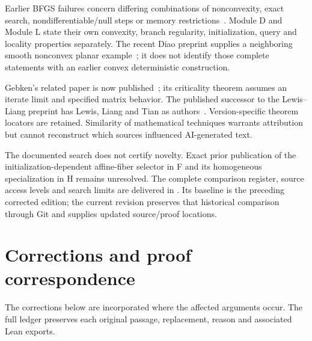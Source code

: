 \documentclass[10pt,oneside,openany]{book}
\theoremstyle{remark}\newtheorem{remark}{Remark}[chapter]
\begin{document}
Earlier BFGS failures concern differing combinations of nonconvexity, exact search, nondifferentiable/null steps or memory restrictions~\cite{NEG_LO08,NEG_M07,NEG_LZ15,NEG_AO21}. Module D and Module L state their own convexity, branch regularity, initialization, query and locality properties separately. The recent Diao preprint supplies a neighboring smooth nonconvex planar example~\cite{NEG_DIAO26}; it does not identify those complete statements with an earlier convex deterministic construction.

Gebken's related paper is now published~\cite{BG}; its criticality theorem assumes an iterate limit and specified matrix behavior. The published successor to the Lewis--Liang preprint has Lewis, Liang and Tian as authors~\cite{LL}. Version-specific theorem locators are retained. Similarity of mathematical techniques warrants attribution but cannot reconstruct which sources influenced AI-generated text.

The documented search does not certify novelty. Exact prior publication of the initialization-dependent affine-fiber selector in F and its homogeneous specialization in H remains unresolved. The complete comparison register, source access levels and search limits are delivered in . Its baseline is the preceding corrected edition; the current revision preserves that historical comparison through Git and supplies updated source/proof locations.

\chapter*{Corrections and proof correspondence}
The corrections below are incorporated where the affected arguments occur. The full ledger preserves each original passage, replacement, reason and associated Lean exports.
\end{document}
